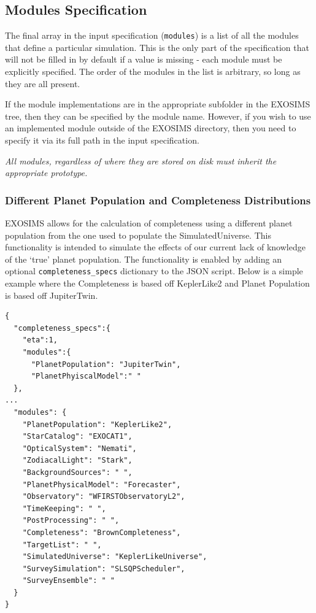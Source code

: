\documentclass[cleanfoot]{asme2ej}
\begin{document}
\subsection{Modules Specification}
The final array in the input specification  (\verb+modules+) is a list of all the modules that define a particular simulation.  This is the only part of the specification that will not be filled in by default if a value is missing - each module must be explicitly specified. The order of the modules in the list is arbitrary, so long as they are all present. 

If the module implementations are in the appropriate subfolder in the EXOSIMS tree, then they can be specified by the module name.  However, if you wish to use an implemented module outside of the EXOSIMS directory, then you need to specify it via its full path in the input specification.

\emph{All modules, regardless of where they are stored on disk must inherit the appropriate prototype.}

\subsubsection{Different Planet Population and Completeness Distributions}
EXOSIMS allows for the calculation of completeness using a different planet population from the one used to populate the SimulatedUniverse. This functionality is intended to simulate the effects of our current lack of knowledge of the `true' planet population. The functionality is enabled by adding an optional \verb+completeness_specs+ dictionary to the JSON script. Below is a simple example where the Completeness is based off KeplerLike2 and Planet Population is based off JupiterTwin.

\begin{verbatim}
{
  "completeness_specs":{
    "eta":1,
    "modules":{
      "PlanetPopulation": "JupiterTwin",
      "PlanetPhyiscalModel":" "
  },
...
  "modules": {
    "PlanetPopulation": "KeplerLike2",
    "StarCatalog": "EXOCAT1",
    "OpticalSystem": "Nemati",
    "ZodiacalLight": "Stark",
    "BackgroundSources": " ",
    "PlanetPhysicalModel": "Forecaster",
    "Observatory": "WFIRSTObservatoryL2",
    "TimeKeeping": " ",
    "PostProcessing": " ",
    "Completeness": "BrownCompleteness",
    "TargetList": " ",
    "SimulatedUniverse": "KeplerLikeUniverse",
    "SurveySimulation": "SLSQPScheduler",
    "SurveyEnsemble": " "
  }
}
\end{verbatim}
\end{document}

